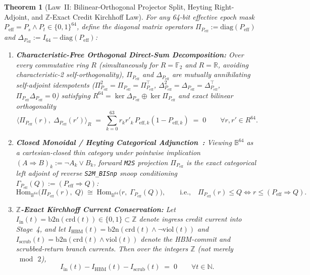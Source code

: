 \documentclass[11pt,letterpaper]{article}
\theoremstyle{spectralthm}
\newtheorem{theorem}{Theorem}[section]
\begin{document}
\begin{theorem}[Law~II: Bilinear-Orthogonal Projector Split, Heyting Right-Adjoint, and $\mathbb{Z}$-Exact Credit Kirchhoff Law]
\label{thm:law2_hodge_kirchhoff}
For any 64-bit effective epoch mask $P_{\mathrm{eff}} = P_s \wedge P_t \in \{0,1\}^{64}$, define the diagonal matrix operators $\Pi_{P_{\mathrm{eff}}} := \mathrm{diag}(P_{\mathrm{eff}})$ and $\Delta_{P_{\mathrm{eff}}} := I_{64} - \mathrm{diag}(P_{\mathrm{eff}})$:
\begin{enumerate}
\item \textbf{Characteristic-Free Orthogonal Direct-Sum Decomposition:} Over every commutative ring $R$ (simultaneously for $R = \mathbb{F}_2$ and $R = \mathbb{R}$, avoiding characteristic-2 self-orthogonality), $\Pi_{P_{\mathrm{eff}}}$ and $\Delta_{P_{\mathrm{eff}}}$ are mutually annihilating self-adjoint idempotents ($\Pi_{P_{\mathrm{eff}}}^2 = \Pi_{P_{\mathrm{eff}}} = \Pi_{P_{\mathrm{eff}}}^\top$, $\Delta_{P_{\mathrm{eff}}}^2 = \Delta_{P_{\mathrm{eff}}} = \Delta_{P_{\mathrm{eff}}}^\top$, $\Pi_{P_{\mathrm{eff}}}\Delta_{P_{\mathrm{eff}}} = 0$) satisfying $R^{64} = \ker \Delta_{P_{\mathrm{eff}}} \oplus \ker \Pi_{P_{\mathrm{eff}}}$ and exact bilinear orthogonality
\begin{equation}
\label{eq:law2_bilinear_orth}
\bigl\langle \Pi_{P_{\mathrm{eff}}}(r),\; \Delta_{P_{\mathrm{eff}}}(r') \bigr\rangle_R \;=\; \sum_{k=0}^{63} r_k r'_k\, P_{\mathrm{eff},k}(1 - P_{\mathrm{eff},k}) \;=\; 0 \qquad \forall r, r' \in R^{64}.
\end{equation}
\item \textbf{Closed Monoidal / Heyting Categorical Adjunction~\cite{heyting1930formalen}:} Viewing $\mathbb{B}^{64}$ as a cartesian-closed thin category under pointwise implication $(A \Rightarrow B)_k := \neg A_k \vee B_k$, forward \texttt{M2S} projection $\Pi_{P_{\mathrm{eff}}}$ is the exact categorical left adjoint of reverse \texttt{S2M\_BISnp} snoop conditioning $\Gamma_{P_{\mathrm{eff}}}(Q) := (P_{\mathrm{eff}} \Rightarrow Q)$:
\begin{equation}
\label{eq:law2_heyting_adj}
\mathrm{Hom}_{\mathbb{B}^{64}}\bigl(\Pi_{P_{\mathrm{eff}}}(r),\; Q\bigr) \;\cong\; \mathrm{Hom}_{\mathbb{B}^{64}}\bigl(r,\; \Gamma_{P_{\mathrm{eff}}}(Q)\bigr), \qquad \text{i.e.,}\quad \Pi_{P_{\mathrm{eff}}}(r) \le Q \iff r \le (P_{\mathrm{eff}} \Rightarrow Q).
\end{equation}
\item \textbf{$\mathbb{Z}$-Exact Kirchhoff Current Conservation:} Let $I_{\mathrm{in}}(t) = \mathrm{b2n}(\mathrm{crd}(t)) \in \{0,1\} \subset \mathbb{Z}$ denote ingress credit current into Stage~4, and let $I_{\mathrm{HBM}}(t) = \mathrm{b2n}(\mathrm{crd}(t)\wedge\neg\mathrm{viol}(t))$ and $I_{\mathrm{scrub}}(t) = \mathrm{b2n}(\mathrm{crd}(t)\wedge\mathrm{viol}(t))$ denote the HBM-commit and scrubbed-return branch currents. Then over the integers $\mathbb{Z}$ (not merely $\bmod\,2$),
\begin{equation}
\label{eq:law2_kirchhoff_z}
I_{\mathrm{in}}(t) - I_{\mathrm{HBM}}(t) - I_{\mathrm{scrub}}(t) \;=\; 0 \qquad \forall t \in \mathbb{N}.
\end{equation}
\end{enumerate}
\end{theorem}
\end{document}
